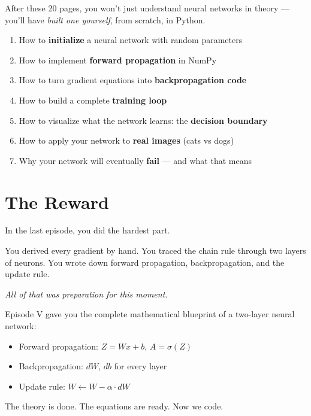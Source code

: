 \documentclass[11pt]{article}
\begin{document}
\tableofcontents

\vspace{1.5em}

\begin{defbox}[title=What You'll Learn in This Episode]
After these 20 pages, you won't just understand neural networks in theory --- you'll have \textit{built one yourself}, from scratch, in Python.

\begin{enumerate}[label=\textbf{\arabic*.}]
  \item How to \textbf{initialize} a neural network with random parameters
  \item How to implement \textbf{forward propagation} in NumPy
  \item How to turn gradient equations into \textbf{backpropagation code}
  \item How to build a complete \textbf{training loop}
  \item How to visualize what the network learns: the \textbf{decision boundary}
  \item How to apply your network to \textbf{real images} (cats vs dogs)
  \item Why your network will eventually \textbf{fail} --- and what that means
\end{enumerate}
\end{defbox}

\newpage

\section{The Reward}

In the last episode, you did the hardest part.

You derived every gradient by hand.
You traced the chain rule through two layers of neurons.
You wrote down forward propagation, backpropagation, and the update rule.

\textit{All of that was preparation for this moment.}

\begin{recapbox}[title=Where We Left Off]
Episode V gave you the complete mathematical blueprint of a two-layer neural network:
\begin{itemize}
  \item Forward propagation: $Z = Wx + b$, $A = \sigma(Z)$
  \item Backpropagation: $dW$, $db$ for every layer
  \item Update rule: $W \leftarrow W - \alpha \cdot dW$
\end{itemize}
The theory is done. The equations are ready. Now we code.
\end{recapbox}
\end{document}
